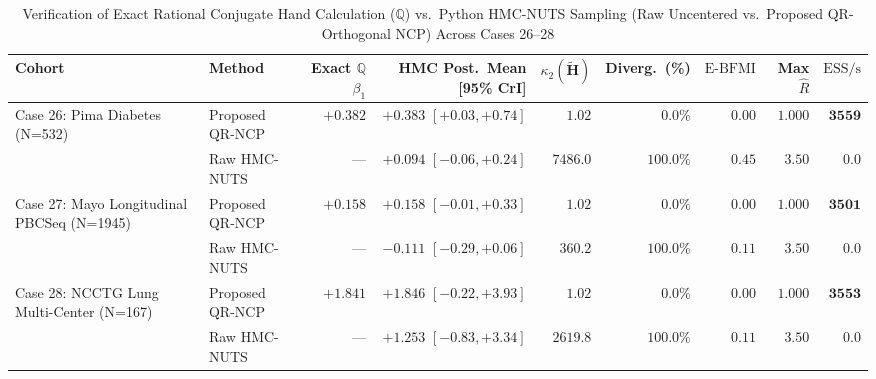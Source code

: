\begin{table}[htbp]
\centering
\caption{Verification of Exact Rational Conjugate Hand Calculation ($\mathbb{Q}$) vs.\ Python HMC-NUTS Sampling (Raw Uncentered vs.\ Proposed QR-Orthogonal NCP) Across Cases 26--28}
\label{tab:bayesian_hmc_verification}
\scriptsize
\begin{tabular}{llrrrrrrr}
\toprule
\textbf{Cohort} & \textbf{Method} & \textbf{Exact $\mathbb{Q}$ $\beta_1$} & \textbf{HMC Post.\ Mean [95\% CrI]} & \textbf{$\kappa_2(\widetilde{\mathbf{H}})$} & \textbf{Diverg.\ (\%)} & \textbf{$\mathrm{E\text{-}BFMI}$} & \textbf{Max $\hat{R}$} & \textbf{$\mathrm{ESS/s}$} \\
\midrule
Case 26: Pima Diabetes (N=532) & Proposed QR-NCP & $\bm{+0.382}$ & $\bm{+0.383}$ $[+0.03, +0.74]$ & $1.02$ & $\bm{0.0\%}$ & $\bm{0.00}$ & $\bm{1.000}$ & $\bm{3559}$ \\
 & Raw HMC-NUTS & --- & $+0.094$ $[-0.06, +0.24]$ & $7486.0$ & $\bm{100.0\%}$ & $0.45$ & $3.50$ & $0.0$ \\
\midrule
Case 27: Mayo Longitudinal PBCSeq (N=1945) & Proposed QR-NCP & $\bm{+0.158}$ & $\bm{+0.158}$ $[-0.01, +0.33]$ & $1.02$ & $\bm{0.0\%}$ & $\bm{0.00}$ & $\bm{1.000}$ & $\bm{3501}$ \\
 & Raw HMC-NUTS & --- & $-0.111$ $[-0.29, +0.06]$ & $360.2$ & $\bm{100.0\%}$ & $0.11$ & $3.50$ & $0.0$ \\
\midrule
Case 28: NCCTG Lung Multi-Center (N=167) & Proposed QR-NCP & $\bm{+1.841}$ & $\bm{+1.846}$ $[-0.22, +3.93]$ & $1.02$ & $\bm{0.0\%}$ & $\bm{0.00}$ & $\bm{1.000}$ & $\bm{3553}$ \\
 & Raw HMC-NUTS & --- & $+1.253$ $[-0.83, +3.34]$ & $2619.8$ & $\bm{100.0\%}$ & $0.11$ & $3.50$ & $0.0$ \\
\bottomrule
\end{tabular}
\end{table}
